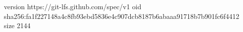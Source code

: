 version https://git-lfs.github.com/spec/v1
oid sha256:fa1f227148a4c8fb93ebd5836e4c907dcb8187b6abaaa91718b7b901fc6f4412
size 2144
